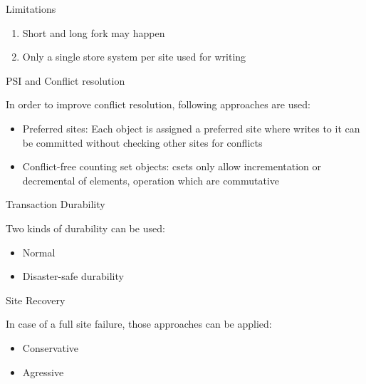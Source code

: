 \documentclass{beamer}
\begin{document}

\begin{frame}{Limitations}

			\begin{enumerate}
			\item Short and long fork may happen
			\item Only a single store system per site used for writing
			\end{enumerate}
			
		\end{frame}

		\begin{frame}{PSI and Conflict resolution}
		
		In order to improve conflict resolution, following approaches are used:
		
		\begin{itemize}
		
		\item Preferred sites: Each object is assigned a preferred site where writes to it can be committed without checking other sites for conflicts
		\item Conflict-free counting set objects: csets only allow incrementation or decremental of elements, operation which are commutative  
		
		\end{itemize}
		
		\end{frame}
		
		\begin{frame}{Transaction Durability}
		
		Two kinds of durability can be used:

		\begin{itemize}
		\item Normal
		\item Disaster-safe durability
		\end{itemize}		
		
		\end{frame} 	
		
		\begin{frame}{Site Recovery}
		
		In case of a full site failure, those approaches can be applied:
		\begin{itemize}
		\item Conservative
		\item Agressive
		\end{itemize}		
		
		\end{frame}	 	
			 	
\end{document}
